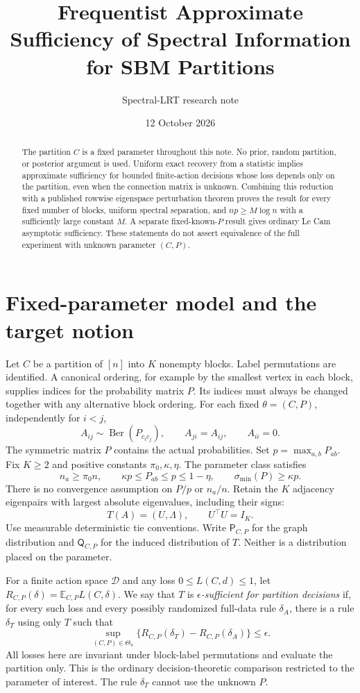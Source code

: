 \documentclass[11pt]{article}
\title{Frequentist Approximate Sufficiency of Spectral Information\\for SBM Partitions}
\author{Spectral-LRT research note}
\date{12 October 2026}
\newcommand{\PP}{\mathsf P}
\newcommand{\QQ}{\mathsf Q}
\newcommand{\EE}{\mathbb E}
\begin{document}
\maketitle
\begin{abstract}
The partition $C$ is a fixed parameter throughout this note. No prior,
random partition, or posterior argument is used. Uniform exact recovery
from a statistic implies approximate sufficiency for bounded finite-action decisions
whose loss depends only on the partition, even when the connection matrix
is unknown. Combining this reduction with a published rowwise eigenspace
perturbation theorem proves the result for every fixed number of blocks,
uniform spectral separation, and $np\ge M\log n$ with a sufficiently large
constant $M$. A separate fixed-known-$P$ result gives ordinary Le Cam
asymptotic sufficiency. These statements do not assert equivalence of the
full experiment with unknown parameter $(C,P)$.
\end{abstract}

\section{Fixed-parameter model and the target notion}
Let $C$ be a partition of $[n]$ into $K$ nonempty blocks. Label permutations
are identified. A canonical ordering, for example by the smallest vertex in
each block, supplies indices for the probability matrix $P$. Its indices
must always be changed together with any alternative block ordering.
For each fixed $\theta=(C,P)$, independently for $i<j$,
\[
 A_{ij}\sim\operatorname{Ber}(P_{c_i c_j}),\qquad
 A_{ji}=A_{ij},\qquad A_{ii}=0.
\]
The symmetric matrix $P$ contains the actual probabilities. Set
$p=\max_{a,b}P_{ab}$. Fix $K\ge2$ and positive constants
$\pi_0,\kappa,\eta$. The parameter class satisfies
\begin{equation}\label{eq:model}
 n_a\ge\pi_0 n,\qquad
 \kappa p\le P_{ab}\le p\le1-\eta,\qquad
 \sigma_{\min}(P)\ge\kappa p.
\end{equation}
There is no convergence assumption on $P/p$ or $n_a/n$. Retain the $K$
adjacency eigenpairs with largest absolute eigenvalues, including their signs:
\[
 T(A)=(U,\Lambda),\qquad U^\top U=I_K.
\]
Use measurable deterministic tie conventions. Write
$\PP_{C,P}$ for the graph distribution and $\QQ_{C,P}$ for the induced
distribution of $T$. Neither is a distribution placed on the parameter.

For a finite action space $\mathcal D$ and any loss
$0\le L(C,d)\le1$, let
$R_{C,P}(\delta)=\EE_{C,P}L(C,\delta)$.
We say that $T$ is \emph{$\epsilon$-sufficient for partition decisions}
if, for every such loss and every possibly randomized full-data rule
$\delta_A$, there is a rule $\delta_T$ using only $T$ such that
\begin{equation}\label{eq:decision}
 \sup_{(C,P)\in\Theta_n}
 \{R_{C,P}(\delta_T)-R_{C,P}(\delta_A)\}\le\epsilon.
\end{equation}
All losses here are invariant under block-label permutations and evaluate
the partition only. This is the ordinary decision-theoretic comparison
restricted to the parameter of interest. The rule $\delta_T$ cannot use
the unknown $P$.
\end{document}
